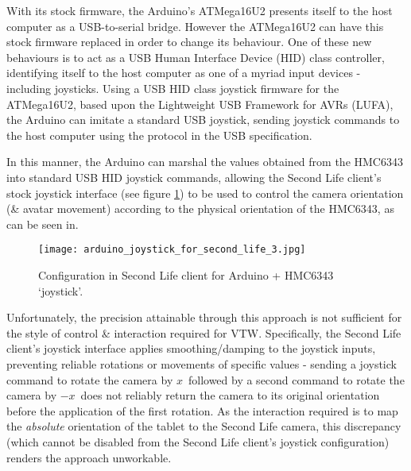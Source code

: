 With its stock firmware, the Arduino's ATMega16U2 presents itself to the host computer as a USB-to-serial bridge. However the ATMega16U2 can have this stock firmware replaced in order to change its behaviour. One of these new behaviours is to act as a USB Human Interface Device (HID) class controller, identifying itself to the host computer as one of a myriad input devices - including joysticks. Using a USB HID class joystick firmware for the ATMega16U2\arduinousbhidFootnote{}, based upon the Lightweight USB Framework for AVRs (LUFA)\lufaFootnote{}, the Arduino can imitate a standard USB joystick, sending joystick commands to the host computer using the protocol in the USB specification.


In this manner, the Arduino can marshal the values obtained from the HMC6343 into standard USB HID joystick commands, allowing the Second Life client's stock joystick interface (see figure \ref{arduino_joystick_for_second_life_3.jpg}) to be used to control the camera orientation (\& avatar movement) according to the physical orientation of the HMC6343, as can be seen in\ArduinoJoystickVideoFootnote{}.

\begin{figure}[h]
\centering
  \texttt{[image: arduino\_joystick\_for\_second\_life\_3.jpg]}
  \caption{Configuration in Second Life client for Arduino + HMC6343 `joystick'.}
  \label{arduino_joystick_for_second_life_3.jpg}
\end{figure}

Unfortunately, the precision attainable through this approach is not sufficient for the style of control \& interaction required for VTW. Specifically, the Second Life client's joystick interface applies smoothing/damping to the joystick inputs, preventing reliable rotations or movements of specific values - sending a joystick command to rotate the camera by $x$\textdegree\ followed by a second command to rotate the camera by $-x$\textdegree\ does not reliably return the camera to its original orientation before the application of the first rotation. As the interaction required is to map the \textit{absolute} orientation of the tablet to the Second Life camera, this discrepancy (which cannot be disabled from the Second Life client's joystick configuration) renders the approach unworkable.


